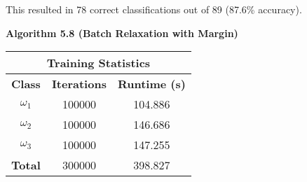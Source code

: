 \documentclass{article}
\newcommand{\fakesection}[1]{{\bf #1}\par}
\begin{document}
This resulted in 78 correct classifications out of 89 (87.6\% accuracy).

\bigskip
\fakesection{Algorithm 5.8 (Batch Relaxation with Margin)}
\begin{center}
\begin{tabular}{|c|c|c|}
\hline\multicolumn{3}{|c|}{{\bf Training Statistics}}\\
\hline{\bf Class} & {\bf Iterations} & {\bf Runtime (s)}\\\hline
$\omega_1$ & 100000 & 104.886 \\
$\omega_2$ & 100000 & 146.686 \\
$\omega_3$ & 100000 & 147.255\\\hline
{\bf Total} & 300000 & 398.827\\\hline
\end{tabular}
\end{center}
\end{document}

